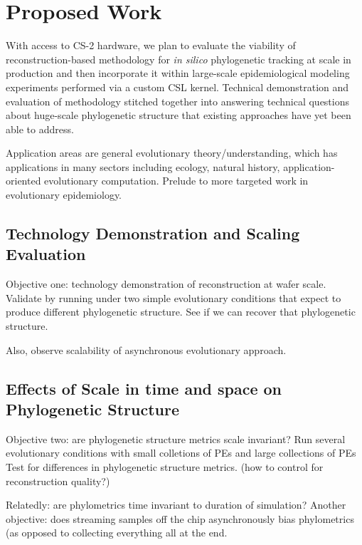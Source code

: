 \section{Proposed Work} \label{sec:objectives}

With access to CS-2 hardware, we plan to evaluate the viability of reconstruction-based methodology for \textit{in silico} phylogenetic tracking at scale in production and then incorporate it within large-scale epidemiological modeling experiments performed via a custom CSL kernel.
Technical demonstration and evaluation of methodology stitched together into answering technical questions about huge-scale phylogenetic structure that existing approaches have yet been able to address.

Application areas are general evolutionary theory/understanding, which has applications in many sectors including ecology, natural history, application-oriented evolutionary computation.
Prelude to more targeted work in evolutionary epidemiology.

\subsection{Technology Demonstration and Scaling Evaluation}
Objective one: technology demonstration of reconstruction at wafer scale.
Validate by running under two simple evolutionary conditions that expect to produce different phylogenetic structure.
See if we can recover that phylogenetic structure.

Also, observe scalability of asynchronous evolutionary approach.

\subsection{Effects of Scale in time and space on Phylogenetic Structure}
Objective two: are phylogenetic structure metrics scale invariant?
Run several evolutionary conditions with small colletions of PEs and large collections of PEs
Test for differences in phylogenetic structure metrics.
(how to control for reconstruction quality?)

Relatedly: are phylometrics time invariant to duration of simulation?
Another objective: does streaming samples off the chip asynchronously bias phylometrics (as opposed to collecting everything all at the end.


